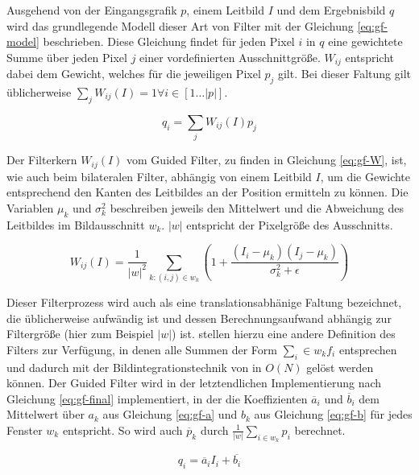 Ausgehend von der Eingangsgrafik \(p\), einem Leitbild \(I\) und dem Ergebnisbild \(q\) wird das grundlegende Modell dieser Art von Filter mit der Gleichung \ref{eq:gf-model} beschrieben. Diese Gleichung findet für jeden Pixel \(i\) in \(q\) eine gewichtete Summe über jeden Pixel \(j\) einer vordefinierten Ausschnittgröße. \(W_{ij}\) entspricht dabei dem Gewicht, welches für die jeweiligen Pixel \(p_j\) gilt. Bei dieser Faltung gilt üblicherweise  \(\sum_{j} W_{ij}(I)=1 \forall i \in [1\ldots |p|]\). \citep{he2010guided}

\begin{equation} \label{eq:gf-model}
q_{i} = \sum_j W_{ij}(I)p_j
\end{equation}

Der Filterkern \(W_{ij}(I)\) vom Guided Filter, zu finden in Gleichung \ref{eq:gf-W}, ist, wie auch beim bilateralen Filter, abhängig von einem Leitbild \(I\), um die Gewichte entsprechend den Kanten des Leitbildes an der Position ermitteln zu können. Die Variablen \(\mu_k\) und \(\sigma^2_k\) beschreiben jeweils den Mittelwert und die Abweichung des Leitbildes im Bildausschnitt \(w_k\). \(|w|\) entspricht der Pixelgröße des Ausschnitts. \citep{he2010guided}

\begin{equation} \label{eq:gf-W}
W_{ij}(I) = \frac{1}{|w|^2} \sum_{k:(i,j) \in w_k} (1+\frac{(I_i-\mu_k)(I_j-\mu_k)}{\sigma^2_k + \epsilon})
\end{equation}

Dieser Filterprozess wird auch als eine translationsabhänige Faltung bezeichnet, die üblicherweise aufwändig ist und dessen Berechnungsaufwand abhängig zur Filtergröße (hier zum Beispiel \(|w|\)) ist. \citet{he2010guided} stellen hierzu eine andere Definition des Filters zur Verfügung, in denen alle Summen der Form \(\sum_i\in w_k f_i\) entsprechen und dadurch mit der Bildintegrationstechnik von \citet{crow1984summed} in \(O(N)\) gelöst werden können. Der Guided Filter wird in der letztendlichen Implementierung nach Gleichung \ref{eq:gf-final} implementiert, in der die Koeffizienten \(\overline{a}_i\) und \(\overline{b}_i\) dem Mittelwert über \(a_k\) aus Gleichung \ref{eq:gf-a} und \(b_k\) aus Gleichung \ref{eq:gf-b} für jedes Fenster \(w_k\) entspricht. So wird auch \(\overline{p}_k\) durch \(\frac{1}{|w|} \sum_{i \in w_k} p_i\) berechnet.

\begin{equation} \label{eq:gf-final}
q_i = \overline{a}_iI_i+\overline{b_i}
\end{equation}

